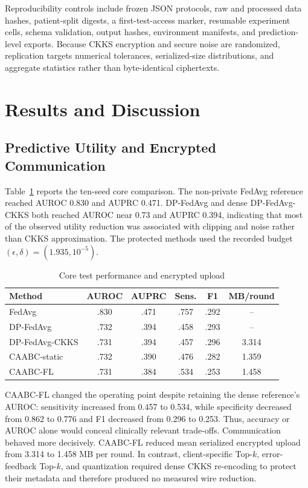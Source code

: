 \documentclass[conference]{IEEEtran}
\begin{document}
Reproducibility controls include frozen JSON protocols, raw and processed data
hashes, patient-split digests, a first-test-access marker, resumable experiment
cells, schema validation, output hashes, environment manifests, and
prediction-level exports. Because CKKS encryption and secure noise are
randomized, replication targets numerical tolerances, serialized-size
distributions, and aggregate statistics rather than byte-identical ciphertexts.

\section{Results and Discussion}
\label{sec:results}

\subsection{Predictive Utility and Encrypted Communication}

Table~\ref{tab:paper-core-results} reports the ten-seed core comparison. The
non-private FedAvg reference reached AUROC 0.830 and AUPRC 0.471. DP-FedAvg and
dense DP-FedAvg-CKKS both reached AUROC near 0.73 and AUPRC 0.394, indicating
that most of the observed utility reduction was associated with clipping and
noise rather than CKKS approximation. The protected methods used the recorded
budget $(\epsilon,\delta)=(1.935,10^{-5})$.

\begin{table}[t]
\caption{Core test performance and encrypted upload}
\label{tab:paper-core-results}
\centering
\scriptsize
\setlength{\tabcolsep}{2.7pt}
\begin{tabular}{@{}lccccc@{}}
\toprule
Method & AUROC & AUPRC & Sens. & F1 & MB/round \\
\midrule
FedAvg & .830 & .471 & .757 & .292 & -- \\
DP-FedAvg & .732 & .394 & .458 & .293 & -- \\
DP-FedAvg-CKKS & .731 & .394 & .457 & .296 & 3.314 \\
CAABC-static & .732 & .390 & .476 & .282 & 1.359 \\
CAABC-FL & .731 & .384 & .534 & .253 & 1.458 \\
\bottomrule
\end{tabular}
\end{table}

CAABC-FL changed the operating point despite retaining the dense reference's
AUROC: sensitivity increased from 0.457 to 0.534, while specificity decreased
from 0.862 to 0.776 and F1 decreased from 0.296 to 0.253. Thus, accuracy or AUROC
alone would conceal clinically relevant trade-offs. Communication behaved more
decisively. CAABC-FL reduced mean serialized encrypted upload from 3.314 to
1.458 MB per round. In contrast, client-specific Top-$k$, error-feedback Top-$k$,
and quantization required dense CKKS re-encoding to protect their metadata and
therefore produced no measured wire reduction.
\end{document}
